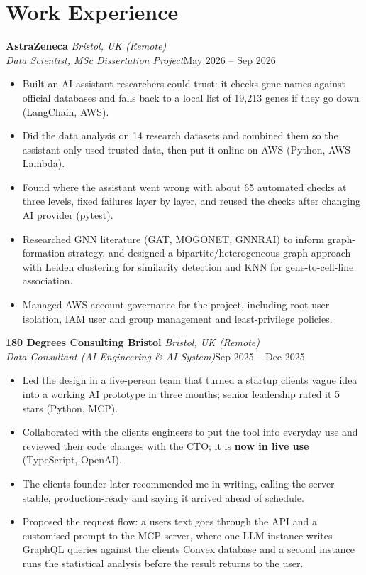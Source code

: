 \documentclass[a4paper,11pt]{article}
\newcommand{\role}[4]{%
  \textbf{#1}{\color{muted}\,\textperiodcentered\,\textit{#2}}\\
  \textit{#4}\hfill{\color{muted}#3}\par}
\newcommand{\gap}{\vspace{5pt}}
\newcommand{\num}[1]{\textbf{#1}}   %
\begin{document}
\section{Work Experience}
\role{AstraZeneca}{Bristol, UK (Remote)}{May 2026 – Sep 2026}{Data Scientist, MSc Dissertation Project}
\begin{itemize}
  \item Built an AI assistant researchers could trust: it checks gene names against official databases and falls back to a local list of 19,213 genes if they go down (LangChain, AWS).
  \item Did the data analysis on 14 research datasets and combined them so the assistant only used trusted data, then put it online on AWS (Python, AWS Lambda).
  \item Found where the assistant went wrong with about 65 automated checks at three levels, fixed failures layer by layer, and reused the checks after changing AI provider (pytest).
  \item Researched GNN literature (GAT, MOGONET, GNNRAI) to inform graph-formation strategy, and designed a bipartite/heterogeneous graph approach with Leiden clustering for similarity detection and KNN for gene-to-cell-line association.
  \item Managed AWS account governance for the project, including root-user isolation, IAM user and group management and least-privilege policies.
\end{itemize}
\gap
{}
\role{180 Degrees Consulting Bristol}{Bristol, UK (Remote)}{Sep 2025 – Dec 2025}{Data Consultant (AI Engineering \& AI System)}
\begin{itemize}
  \item Led the design in a five-person team that turned a startup client\textquotesingle{}s vague idea into a working AI prototype in three months; senior leadership rated it 5 stars (Python, MCP).
  \item Collaborated with the client\textquotesingle{}s engineers to put the tool into everyday use and reviewed their code changes with the CTO; it is \num{now in live use} (TypeScript, OpenAI).
  \item The client\textquotesingle{}s founder later recommended me in writing, calling the server \textquotesingle{}stable, production-ready\textquotesingle{} and saying it arrived ahead of schedule.
  \item Proposed the request flow: a user\textquotesingle{}s text goes through the API and a customised prompt to the MCP server, where one LLM instance writes GraphQL queries against the client\textquotesingle{}s Convex database and a second instance runs the statistical analysis before the result returns to the user.
\end{itemize}
\end{document}
